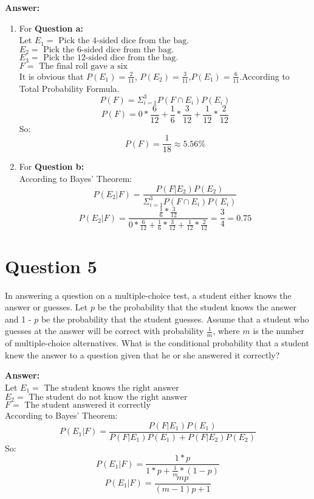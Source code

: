 \documentclass[hidelinks]{article}
\begin{document}
\textbf{\large Answer:}
\begin{enumerate}
    \item For \textbf{Question a:}\\
    Let $ E_1 = \text{ Pick the 4-sided dice from the bag. }$\\
    $ E_2 = \text{ Pick the 6-sided dice from the bag. }$\\
    $ E_3 = \text{ Pick the 12-sided dice from the bag. }$\\
    $ F = \text{ The final roll gave a six }$\\
    It is obvious that $P(E_1)=\frac{2}{11}$, $P(E_2)=\frac{3}{11}$,$P(E_1)=\frac{6}{11}$.According to Total Probability Formula.
    $$ P(F) = \Sigma^3_{i=1}P(F \cap E_i)P(E_i)$$
    $$ P(F) = 0*\frac{6}{12} + \frac{1}{6}*\frac{3}{12} + \frac{1}{12}*\frac{2}{12}$$
    So:
    $$ P(F) = \frac{1}{18} \approx 5.56\%$$

    \item For \textbf{Question b:}\\
    According to Bayes' Theorem:
    $$ P(E_2|F) = \frac{P(F|E_2)P(E_2)}{\Sigma^3_{i=1}P(F \cap E_i)P(E_i)}$$
    $$ P(E_2|F) = \frac{\frac{1}{6}*\frac{3}{12}}{0*\frac{6}{12} + \frac{1}{6}*\frac{3}{12} + \frac{1}{12}*\frac{2}{12}} = \frac{3}{4} = 0.75$$
\end{enumerate}
\section{Question 5}
In answering a question on a multiple-choice test, a student either knows the answer or guesses. Let $p$ be the probability that the student knows the answer and 1 - $p$ be the probability that the student guesses. Assume that a student who guesses at the answer will be correct with probability $\frac{1}{m}$, where $m$ is the number of multiple-choice alternatives. What is the conditional probability that a student knew the answer to a question given that he or she answered it correctly?

\textbf{\large Answer:}\\
Let $ E_1 = \text{ The student knows the right answer} $\\
$ E_2 = \text{ The student do not know the right answer} $\\
$ F = \text{ The student answered it correctly} $\\
According to Bayes' Theorem:
$$ P(E_1|F) = \frac{P(F|E_1)P(E_1)}{P(F|E_1)P(E_1) + P(F|E_2)P(E_2)}$$
So:
$$ P(E_1|F) = \frac{1*p}{1*p + \frac{1}{m}*(1-p)}$$
$$ P(E_1|F) = \frac{mp}{(m-1)p +1}$$
\end{document}
